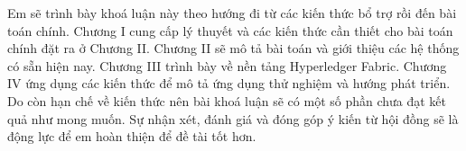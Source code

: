 Em sẽ trình bày khoá luận này theo hướng đi từ các kiến thức bổ trợ rồi đến bài toán chính.
Chương I cung cấp lý thuyết và các kiến thức cần thiết cho bài toán chính đặt ra ở Chương II.
 Chương II sẽ mô tả bài toán và giới thiệu các hệ thống có sẵn hiện nay. 
Chương III trình bày về nền tảng Hyperledger Fabric.
Chương IV ứng dụng các kiến thức để mô tả ứng dụng thử nghiệm và hướng phát triển.
Do còn hạn chế về kiến thức nên bài khoá luận sẽ có một số phần chưa đạt kết quả như mong muốn. 
Sự nhận xét, đánh giá và đóng góp ý kiến từ hội đồng sẽ là động lực để em hoàn thiện để
đề tài tốt hơn.
